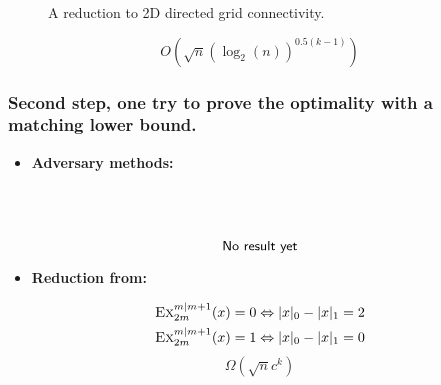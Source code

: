 \documentclass[9pt, notheorems]{beamer}
\theoremstyle{definition}
\theoremstyle{plain}
\theoremstyle{definition}
\begin{document}
\begin{frame}
\begin{minipage}{.45\textwidth}
\begin{figure}
            \caption{A reduction to 2D directed grid connectivity.}
        \end{figure}
        \pause
        {\huge \[O\left(\sqrt{n}(\log_2(n))^{0.5(k-1)}\right)\]}

    \end{minipage}
\end{frame}


\begin{frame}
    \frametitle{Second step, one try to prove the optimality with a matching lower bound.}

    \begin{minipage}{.45\textwidth}
        \begin{itemize}
            \item \textbf{Adversary methods:}
        \end{itemize}
        \begin{align*}
            \phantom{\textsc{Ex}_{2m}^{m|m+1}(x)=0 } & \phantom{\Leftrightarrow |x|_0-|x|_1 = 2} \\
            \phantom{\textsc{Ex}_{2m}^{m|m+1}(x)=1}  & \phantom{\Leftrightarrow |x|_0-|x|_1 = 0} \\
        \end{align*}
        {\huge  \[\textrm{\sffamily{No\ result\ yet}}\]}
    \end{minipage}
    \pause
    \hfill
    \begin{minipage}{.45\textwidth}
        \begin{itemize}
            \item \textbf{Reduction from:}
        \end{itemize}
        \begin{align*}
            \textsc{Ex}_{2m}^{m|m+1}(x)=0 & \Leftrightarrow |x|_0-|x|_1 = 2 \\
            \textsc{Ex}_{2m}^{m|m+1}(x)=1 & \Leftrightarrow |x|_0-|x|_1 = 0 \\
        \end{align*}
        {\huge \[\Omega\left(\sqrt{n}c^{k}\right)\]}
    \end{minipage}
\end{frame}
\end{document}
